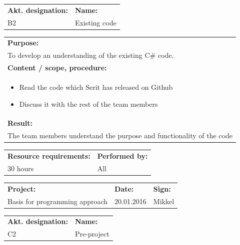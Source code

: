 \documentclass[12pt, a4paper]{article}
\begin{document}
\begin{tabularx}{\textwidth}{|p{40mm}|X|}
	\textbf{Akt. designation:}&\textbf{Name:}\\
	B2&Existing code\\
	\hline
\end{tabularx}

\begin{tabularx}{\textwidth}{|X|}
	\textbf{Purpose:}\\
	To develop an understanding of the existing C\# code.\\
	\hline
	\textbf{Content / scope, procedure:}\\
	\begin{itemize}
		\item Read the code which Serit has released on Github
		\item Discuss it with the rest of the team members
\end{itemize}\\
 	\hline
	\textbf{Result:}\\
	The team members understand the purpose and functionality of the code\\
	\hline
\end{tabularx}

\begin{tabularx}{\textwidth}{|X|p{30mm}|}
	\textbf{Resource requirements:}&\textbf{Performed by:}\\
	30 hours&All\\
	\hline
\end{tabularx}

\newpage

\begin{tabularx}{\textwidth}{|X|p{32mm}|p{20mm}|}
	\hline
	\textbf{Project:}&\textbf{Date:}&\textbf{Sign:}\\
	Basis for programming approach&20.01.2016&Mikkel\\
	\hline
\end{tabularx}

\begin{tabularx}{\textwidth}{|p{40mm}|X|}
	\textbf{Akt. designation:}&\textbf{Name:}\\
	C2&Pre-project\\
	\hline
\end{tabularx}
\end{document}
